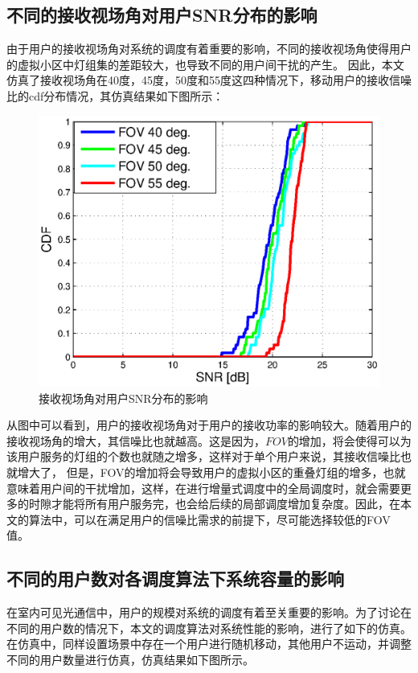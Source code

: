 \subsection{不同的接收视场角对用户SNR分布的影响}
由于用户的接收视场角对系统的调度有着重要的影响，不同的接收视场角使得用户的虚拟小区中灯组集的差距较大，也导致不同的用户间干扰的产生。
因此，本文仿真了接收视场角在40度，45度，50度和55度这四种情况下，移动用户的接收信噪比的cdf分布情况，其仿真结果如下图所示：

\begin{figure}[htbp]
    \centering
	\includegraphics[width=\textwidth]{figures/chapter-5/Fov2Snr.eps}
	\caption{接收视场角对用户SNR分布的影响}
	\label{fig:Fov-2-Snr}
\end{figure}

从图中可以看到，用户的接收视场角对于用户的接收功率的影响较大。随着用户的接收视场角的增大，其信噪比也就越高。这是因为，$FOV$的增加，将会使得可以为该用户服务的灯组的个数也就随之增多，这样对于单个用户来说，其接收信噪比也就增大了，
但是，FOV的增加将会导致用户的虚拟小区的重叠灯组的增多，也就意味着用户间的干扰增加，这样，在进行增量式调度中的全局调度时，就会需要更多的时隙才能将所有用户服务完，也会给后续的局部调度增加复杂度。因此，在本文的算法中，可以在满足用户的信噪比需求的前提下，尽可能选择较低的FOV值。

\subsection{不同的用户数对各调度算法下系统容量的影响}
在室内可见光通信中，用户的规模对系统的调度有着至关重要的影响。为了讨论在不同的用户数的情况下，本文的调度算法对系统性能的影响，进行了如下的仿真。
在仿真中，同样设置场景中存在一个用户进行随机移动，其他用户不运动，并调整不同的用户数量进行仿真，仿真结果如下图所示。

